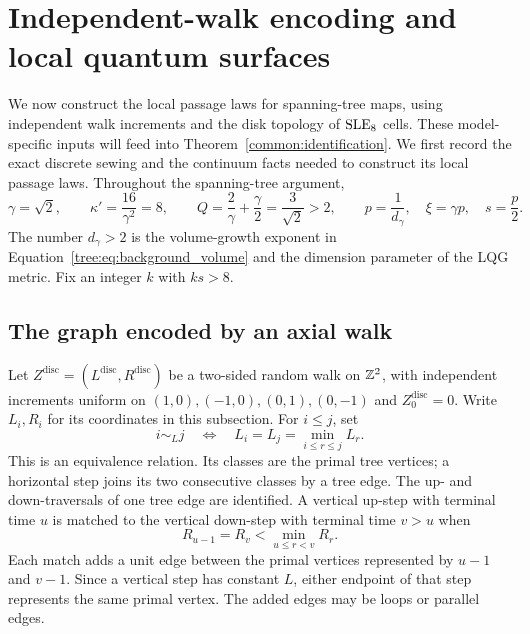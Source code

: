 \section{Independent-walk encoding and local quantum surfaces}
\label{tree:sec:background}

We now construct the local passage laws for spanning-tree maps, using
independent walk increments and the disk topology of $\mathrm{SLE}_8$ cells.
These model-specific inputs will feed into
Theorem~\ref{common:identification}. We first record the exact
discrete sewing and the continuum facts needed to construct its local
passage laws. Throughout the spanning-tree argument,
\begin{equation}\label{tree:eq:parameters}
 \gamma=\sqrt2,\qquad \kappa'=\frac{16}{\gamma^2}=8,\qquad
 Q=\frac2\gamma+\frac\gamma2=\frac3{\sqrt2}>2,
 \qquad p=\frac1{d_\gamma},\quad \xi=\gamma p,
 \quad s=\frac p2.
\end{equation}
The number $d_\gamma>2$ is the volume-growth exponent in
Equation~\eqref{tree:eq:background_volume} and the dimension parameter
of the LQG metric. Fix an integer $k$ with $ks>8$.

\subsection{The graph encoded by an axial walk}

Let $Z^{\mathrm{disc}}=(L^{\mathrm{disc}},R^{\mathrm{disc}})$ be a
two-sided random walk on $\mathbb Z^2$, with independent increments uniform
on $(1,0),(-1,0),(0,1),(0,-1)$ and $Z^{\mathrm{disc}}_0=0$.
Write $L_i,R_i$ for its coordinates in this subsection. For $i\leq j$, set
\begin{equation}\label{tree:eq:discrete_tree_equivalence}
 i\sim_L j\quad\Longleftrightarrow\quad
 L_i=L_j=\min_{i\leq r\leq j}L_r.
\end{equation}
This is an equivalence relation. Its classes are the primal tree
vertices; a horizontal step joins its two consecutive classes by
a tree edge. The up- and down-traversals of one tree edge are
identified. A vertical up-step with terminal time $u$ is matched
to the vertical down-step with terminal time $v>u$ when
\begin{equation}\label{tree:eq:discrete_R_match}
 R_{u-1}=R_v<\min_{u\leq r<v}R_r.
\end{equation}
Each match adds a unit edge between the primal vertices represented
by $u-1$ and $v-1$. Since a vertical step has constant $L$, either
endpoint of that step represents the same primal vertex. The added
edges may be loops or parallel edges.

